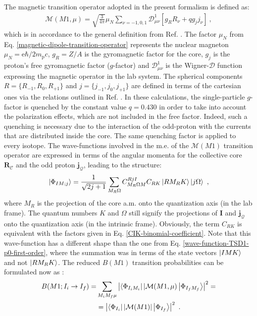 The magnetic transition operator adopted in the present formalism is defined as:
\begin{align}
    \mathcal{M}(M1,\mu)=\sqrt{\frac{3}{4\pi}}\mu_N\sum_{\nu=-1,0,1}\mathcal{D}_{\mu\nu}^1\left[g_RR_\nu+qg_jj_\nu\right]\ ,
    \label{magnetic-dipole-transition-operator}
\end{align}
which is in accordance to the general definition from Ref. \cite{toki1975asymmetric}. The factor $\mu_N$ from Eq. \ref{magnetic-dipole-transition-operator} represents the nuclear magneton $\mu_N=\mathrm{e}\hbar/2m_\text{p}c$, $g_R=Z/A$ is the gyromagnetic factor for the core, $g_j$ is the proton's free gyromagnetic factor ($g$-factor) \cite{tiesinga2021codata} and $\mathcal{D}_{\mu\nu}^1$ is the Wigner-$\mathcal{D}$ function expressing the magnetic operator in the lab system. The spherical components $R=\{R_{-1},R_0,R_{+1}\}$ and $j=\{j_{-1},j_0,j_{+1}\}$ are defined in terms of the cartesian ones via the relations outlined in Ref. \cite{varshalovich1988quantum}. In these calculations, the single-particle $g$-factor is quenched by the constant value $q=0.430$ in order to take into account the polarization effects, which are not included in the free factor. Indeed, such a quenching is necessary due to the interaction of the odd-proton with the currents that are distributed inside the core. The same quenching factor is applied to every isotope. The wave-functions involved in the m.e. of the $\mathcal{M}(M1)$ transition operator are expressed in terms of the angular momenta for the collective core $\mathbf{R}_\mathscr{C}$ and the odd proton $\mathbf{j}_\mathcal{Q}$, leading to the structure:
\begin{align}
    \ket{\Phi_{IM;j}}=\frac{1}{\sqrt{2j+1}}\sum_{M_R\Omega}C_{M_R\Omega M}^{RjI}C_{RK}\ket{RM_RK}\ket{j\Omega}\ ,
    \label{wave-function-magnetic}
\end{align}
where $M_R$ is the projection of the core a.m. onto the quantization axis (in the lab frame). The quantum numbers $K$ and $\Omega$ still signify the projections of $\mathbf{I}$ and $\mathbf{j}_\mathcal{Q}$ onto the quantization axis (in the intrinsic frame). Obviously, the term $C_{RK}$ is equivalent with the factors given in Eq. \ref{CIK-binomial-coefficient}. Note that this wave-function has a different shape than the one from Eq. \ref{wave-function-TSD1-p0-first-order}, where the summation was in terms of the state vectors $\ket{IMK}$ and not $\ket{RM_RK}$. The reduced $B(M1)$ transition probabilities can be formulated now as \cite{raduta2017semiclassical}:
\begin{align}
    B(M1;I_i\to I_f)=&\sum_{M_iM_f\mu}\left|\bra{\Phi_{I_iM_i}}|\mathcal{M}(M1,\mu)\ket{\Phi_{I_fM_f}}\right|^2=\nonumber\\
                     &=\left|\bra{\Phi_{I_i}}|\mathcal{M}(M1)|\ket{\Phi_{I_f}}\right|^2\ .
    \label{reduced-BM1-transition}
\end{align}

